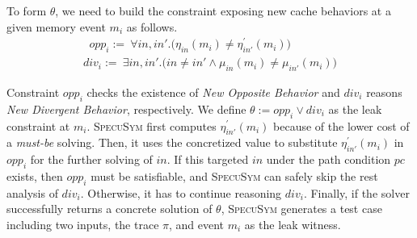\documentclass[sigconf,screen]{acmart}
\newcommand\ignore[1]{}
\newcommand{\pcon}{\mathit{pc}}
\newcommand{\SpecuSym}{\textsc{SpecuSym} }
\begin{document}
To form $\theta$, we need to build the constraint exposing new cache behaviors
at a given memory event $\mathit{m_i}$ as follows.
%
\begin{multline}
  \label{eqn:new_opp}
  ~~~~~~~
  \mathit{opp_i}:=~
  \forall\mathit{in,in'}.
  \big(
  \mathit{\eta_{in}(m_i)\neq\eta_{in'}^\prime(m_i)}
  \big)
  ~~~~~~~~~~~~~~~~~~~~~~~
\end{multline}
%
\begin{multline}
  \label{eqn:new_div}
  ~~~~~~~
  \mathit{div_i}:=~
  \exists\mathit{in,in'}.
  \big(
  \mathit{in\neq in'\wedge\mu_{in}(m_i) \neq \mu_{in'}(m_i)}
  \big)
  ~~~~~~~
\end{multline}
%
%
\ignore{
%
\begin{multline}
  \label{eqn:leak}
  ~~
  \theta:=
  \Big(
  \mathit{div_i}
  \wedge
  \big(
  \sum_{\scriptscriptstyle \mathit{k=0}}^{\scriptscriptstyle\mathit{n}} 
  \mathit{\eta_{in''}(m_k)=}0
  \neq
  \sum_{\scriptscriptstyle \mathit{k=0}}^{\scriptscriptstyle\mathit{n}} 
  \mathit{\eta_{in''}(m_k)=}1
  \big)
  \Big)
  \vee 
  \mathit{opp_i}
  ~~
\end{multline}
%
}
%
\ignore{
Note that 
speculative execution not only evicts cache lines to cause new misses but also loads 
memory data into cache that benefits new hits. Since a leak refers to the noticeable 
timing variance in program runs with and without speculative execution, from 
$\mathit{opp_i}$ the amount of new misses should differ from the amount of new hits. 
And we construct the final leak constraint $\theta$ on this observation:
}
%
%
Constraint $\mathit{opp_i}$ checks the existence of \textit{New Opposite Behavior}
and $\mathit{div_i}$ reasons \textit{New Divergent Behavior}, respectively. We 
define $\theta:=\mathit{opp_i}\vee\mathit{div_i}$ as the leak 
constraint at $\mathit{m_i}$. \SpecuSym first computes 
$\mathit{\eta_{in'}^\prime(m_i)}$ because of the lower cost of a \textit{must-be} 
solving. Then, it uses the concretized value to substitute 
$\mathit{\eta_{in'}^\prime(m_i)}$ in $\mathit{opp_i}$ for the further solving of 
$\mathit{in}$. If this targeted $\mathit{in}$ under the path condition $\pcon$
exists, then $opp_i$ must be satisfiable, and \SpecuSym can safely skip the rest 
analysis of $\mathit{div_i}$. Otherwise, it has to continue reasoning 
$\mathit{div_i}$. Finally, if the solver successfully returns a concrete solution 
of $\theta$, \SpecuSym generates a test case including two inputs, the trace $\pi$, 
and event $\mathit{m_i}$ as the leak witness.
\end{document}
